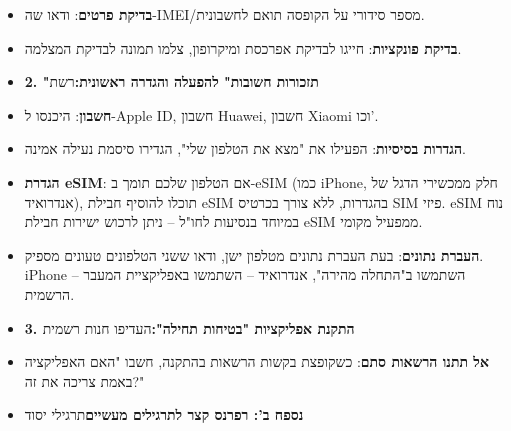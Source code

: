 

\begin{itemize}
  \item \textbf{בדיקת פרטים}: ודאו שה-IMEI/מספר סידורי על הקופסה תואם לחשבונית.
  \item \textbf{בדיקת פונקציות}: חייגו לבדיקת אפרכסת ומיקרופון, צלמו תמונה לבדיקת המצלמה.
  \item \textbf{2. "תזכורות חשובות" להפעלה והגדרה ראשונית:}רשת
\end{itemize}


\begin{itemize}
  \item \textbf{חשבון}: היכנסו ל-Apple ID, חשבון Huawei, חשבון Xiaomi וכו'.
  \item \textbf{הגדרות בסיסיות}: הפעילו את "מצא את הטלפון שלי", הגדירו סיסמת נעילה אמינה.
  \item \textbf{הגדרת eSIM}: אם הטלפון שלכם תומך ב-eSIM (כמו iPhone, חלק ממכשירי הדגל של אנדרואיד), תוכלו להוסיף חבילת eSIM בהגדרות, ללא צורך בכרטיס SIM פיזי. eSIM נוח במיוחד בנסיעות לחו"ל – ניתן לרכוש ישירות חבילת eSIM ממפעיל מקומי.
  \item \textbf{העברת נתונים}: בעת העברת נתונים מטלפון ישן, ודאו ששני הטלפונים טעונים מספיק. iPhone – השתמשו ב"התחלה מהירה", אנדרואיד – השתמשו באפליקציית המעבר הרשמית.
  \item \textbf{3. התקנת אפליקציות "בטיחות תחילה":}העדיפו חנות רשמית
\end{itemize}


\begin{itemize}
  \item \textbf{אל תתנו הרשאות סתם}: כשקופצת בקשות הרשאות בהתקנה, חשבו "האם האפליקציה באמת צריכה את זה?"
  \item \textbf{נספח ב': רפרנס קצר לתרגילים מעשיים}תרגילי יסוד
\end{itemize}
